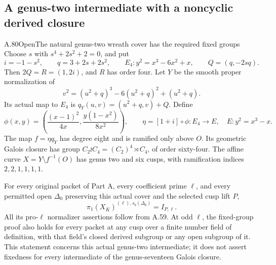 \subsection{A genus-two intermediate with a noncyclic derived closure}

\begin{statement}{A.80}{Open}{The natural genus-two wreath cover has the required fixed groups}
Choose \(s\) with \(s^4+2s^2+2=0\), and put
\[
 i=-1-s^2,\qquad q=3+2s+2s^2,\qquad
 E_4:y^2=x^3-6x^2+x,\qquad Q=(q,-2sq).
                                                        \tag{A.80.1}
\]
Then \(2Q=R=(1,2i)\), and \(R\) has order four.
Let \(Y\) be the smooth proper normalization of
\[
 v^2=(u^2+q)^3-6(u^2+q)^2+(u^2+q).
                                                        \tag{A.80.2}
\]
Its actual map to \(E_4\) is
\(q_Y(u,v)=(u^2+q,v)+Q\). Define
\[
 \phi(x,y)=\left(\frac{(x-1)^2}{4x},
                  \frac{y(1-x^2)}{8x^2}\right),\qquad
 \eta=[1+i]\circ\phi:E_4\longrightarrow E,
 \quad E:y^2=x^3-x.
                                                        \tag{A.80.3}
\]
The map \(f=\eta q_Y\) has degree eight and is ramified only
above \(O\). Its geometric Galois closure has group
\(C_2\wr C_4=(C_2)^4\rtimes C_4\), of order sixty-four.
The affine curve \(X=Y\setminus f^{-1}(O)\) has genus two
and six cusps, with ramification indices \(2,2,1,1,1,1\).

For every original packet of Part A, every coefficient prime
\(\ell\), and every permitted open \(\Delta_0\) preserving
this actual cover and the selected cusp lift \(P\),
\[
       \pi_1(X_{\overline K})^{(\ell),s_b(\Delta_0)}
                              =I_{P,\ell}.              \tag{A.80.4}
\]
All its pro-\(\ell\) normalizer assertions follow from A.59.
At odd \(\ell\), the fixed-group proof also holds for every
packet at any cusp over a finite number field of definition,
with that field's closed derived subgroup or any open subgroup
of it. This statement concerns this actual genus-two intermediate;
it does not assert fixedness for every intermediate of the
genus-seventeen Galois closure.
\end{statement}

